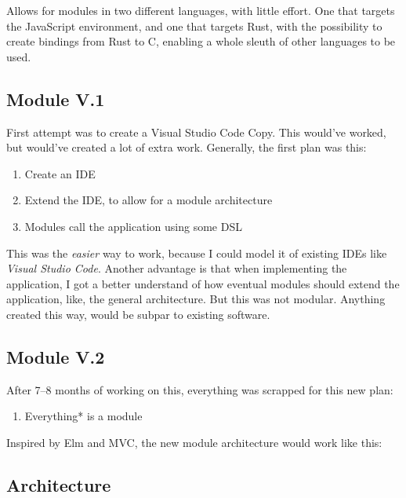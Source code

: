 Allows for modules in two different languages, with little effort. One that
targets the JavaScript environment, and one that targets Rust, with the
possibility to create bindings from Rust to C, enabling a whole sleuth of other
languages to be used.



\subsection{Module V.1}

First attempt was to create a Visual Studio Code Copy. This would've worked, but
would've created a lot of extra work.
Generally, the first plan was this:
\begin{enumerate}
  \item Create an IDE
  \item Extend the IDE, to allow for a module architecture
  \item Modules call the application using some DSL
\end{enumerate}

This was the \textit{easier} way to work, because I could model it of existing
IDEs like \textit{Visual Studio Code}. Another advantage is that when
implementing the application, I got a better understand of how eventual modules
should extend the application, like, the general architecture. But this was not
modular. Anything created this way, would be subpar to existing software.

\subsection{Module V.2}


After 7–8 months of working on this, everything was scrapped for this new plan:
\begin{enumerate}
  \item Everything* is a module
\end{enumerate}

Inspired by Elm and MVC, the new module architecture would work like this:

\subsection{Architecture}
\begin{figure}
  \centering
  
\end{figure}


